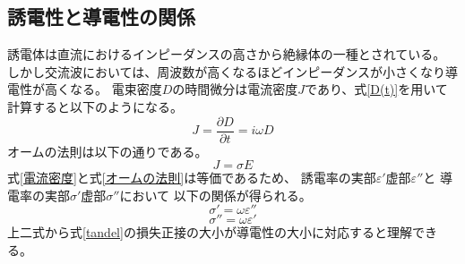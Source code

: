 \documentclass[dvipdfmx,12pt,a4paper]{jreport}
\begin{document}
			\subsection{誘電性と導電性の関係}
			誘電体は直流におけるインピーダンスの高さから絶縁体の一種とされている。
			しかし交流波においては、周波数が高くなるほどインピーダンスが小さくなり導電性が高くなる。
			電束密度$D$の時間微分は電流密度$J$であり、式\ref{D(t)}を用いて計算すると以下のようになる。
			\begin{equation}
				J=\frac{\partial D}{\partial t}=i\omega D
				\label{電流密度}
			\end{equation}
			オームの法則は以下の通りである。
			\begin{equation}
				J=\sigma E
				\label{オームの法則}
			\end{equation}
			式\ref{電流密度}と式\ref{オームの法則}は等価であるため、
			誘電率の実部$\varepsilon'$虚部$\varepsilon''$と
			導電率の実部$\sigma'$虚部$\sigma''$において
			以下の関係が得られる。
			\begin{equation}
				\sigma'=\omega\varepsilon''
			\end{equation}
			\begin{equation}
				\sigma''=\omega\varepsilon'
			\end{equation}
			上二式から式\ref{tandel}の損失正接の大小が導電性の大小に対応すると理解できる。
\end{document}
